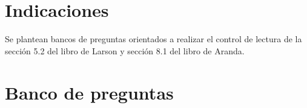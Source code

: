 \documentclass[a4,11pt]{aleph-notas}
\begin{document}
\encabezado

\vspace*{-8mm}
\tableofcontents

\section{Indicaciones}

Se plantean bancos de preguntas orientados a realizar el control de lectura de la sección 5.2 del libro de Larson y sección 8.1 del libro de Aranda.

\section{Banco de preguntas}
\end{document}
